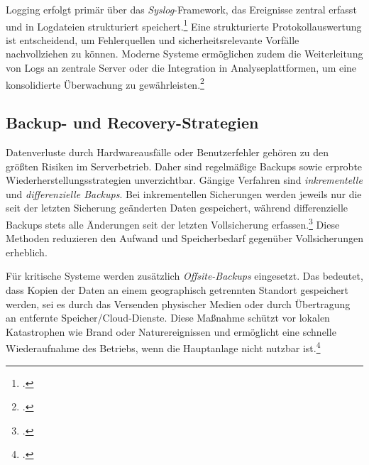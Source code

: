 \documentclass[12pt,a4paper]{report}
\begin{document}
  Logging erfolgt primär über das \emph{Syslog}-Framework, das Ereignisse zentral erfasst und in Logdateien strukturiert speichert.\footcite[Vgl.][S.~344~ff.]{nemeth_unixlinux}  
  Eine strukturierte Protokollauswertung ist entscheidend, um Fehlerquellen und sicherheitsrelevante Vorfälle nachvollziehen zu können. 
  Moderne Systeme ermöglichen zudem die Weiterleitung von Logs an zentrale Server oder die Integration in Analyseplattformen, 
  um eine konsolidierte Überwachung zu gewährleisten.\footcite[Vgl.][S.~348]{nemeth_unixlinux}

  \subsection{Backup- und Recovery-Strategien}
  Datenverluste durch Hardwareausfälle oder Benutzerfehler gehören zu den größten Risiken im Serverbetrieb. 
  Daher sind regelmäßige Backups sowie erprobte Wiederherstellungsstrategien unverzichtbar. 
  Gängige Verfahren sind \emph{inkrementelle} und \emph{differenzielle Backups}. 
  Bei inkrementellen Sicherungen werden jeweils nur die seit der letzten Sicherung 
  geänderten Daten gespeichert, während differenzielle Backups stets alle Änderungen 
  seit der letzten Vollsicherung erfassen.\footcite[Vgl.][S.~305~f.]{nemeth_unixlinux}  
  Diese Methoden reduzieren den Aufwand und Speicherbedarf gegenüber Vollsicherungen erheblich. 

  Für kritische Systeme werden zusätzlich \emph{Offsite-Backups} eingesetzt. 
  Das bedeutet, dass Kopien der Daten an einem geographisch getrennten Standort gespeichert werden, 
  sei es durch das Versenden physischer Medien oder durch Übertragung an entfernte Speicher/Cloud-Dienste. 
  Diese Maßnahme schützt vor lokalen Katastrophen wie Brand oder Naturereignissen 
  und ermöglicht eine schnelle Wiederaufnahme des Betriebs, wenn die Hauptanlage nicht nutzbar ist.\footcite[Vgl.]{wikipedia_offsite_data_protection}  
\end{document}
